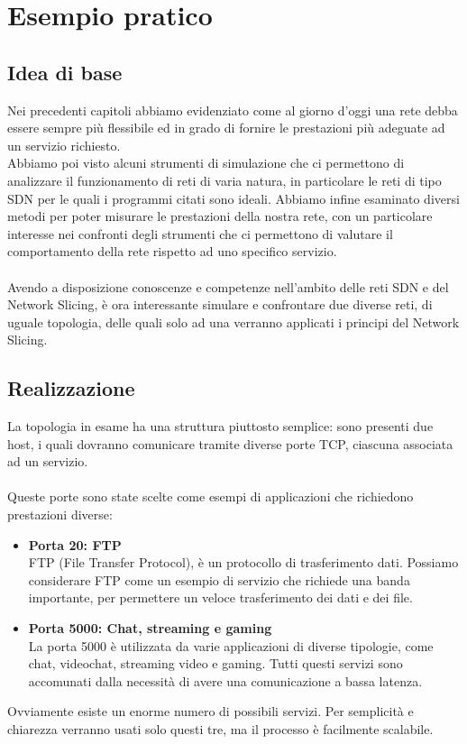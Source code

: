 \chapter{Esempio pratico}\label{ch:capitolo3}

\section{Idea di base}\label{ch:3.1}
Nei precedenti capitoli abbiamo evidenziato come al giorno d'oggi una rete debba essere sempre più flessibile ed in grado di fornire le prestazioni più adeguate ad un servizio richiesto.\\
Abbiamo poi visto alcuni strumenti di simulazione che ci permettono di analizzare il funzionamento di reti di varia natura, in particolare le reti di tipo SDN per le quali i programmi citati sono ideali. Abbiamo infine esaminato diversi metodi per poter misurare le prestazioni della nostra rete, con un particolare interesse nei confronti degli strumenti che ci permettono di valutare il comportamento della rete rispetto ad uno specifico servizio.\\\\
Avendo a disposizione conoscenze e competenze nell'ambito delle reti SDN e del Network Slicing, è ora interessante simulare e confrontare due diverse reti, di uguale topologia, delle quali solo ad una verranno applicati i principi del Network Slicing.
\section{Realizzazione}\label{ch:3.2}
La topologia in esame ha una struttura piuttosto semplice: sono presenti due host, i quali dovranno comunicare tramite diverse porte TCP, ciascuna associata ad un servizio.\\\\
Queste porte sono state scelte come esempi di applicazioni che richiedono prestazioni diverse:\\
\begin{itemize}
	\item \textbf{Porta 20: FTP}\\
	FTP (File Transfer Protocol), è un protocollo di trasferimento dati. Possiamo considerare FTP come un esempio di servizio che richiede una banda importante, per permettere un veloce trasferimento dei dati e dei file.\\
	\item \textbf{Porta 5000: Chat, streaming e gaming}\\
	La porta 5000 è utilizzata da varie applicazioni di diverse tipologie, come chat, videochat, streaming video e gaming. Tutti questi servizi sono accomunati dalla necessità di avere una comunicazione a bassa latenza.\\
\end{itemize}
Ovviamente esiste un enorme numero di possibili servizi. Per semplicità e chiarezza verranno usati solo questi tre, ma il processo è facilmente scalabile.\\
